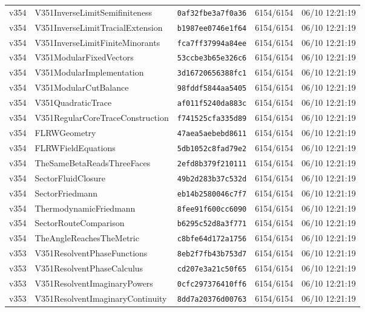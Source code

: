 \documentclass[11pt]{article}
\theoremstyle{definition}\newtheorem{deriv}{Derivation}
\begin{document}
{\begin{longtable}{@{}lllll@{}}
v354 & V351InverseLimitSemifiniteness & \texttt{0af32fbe3a7f0a36} & 6154/6154 & 06/10 12:21:19 \\
v354 & V351InverseLimitTracialExtension & \texttt{b1987ee0746e1f64} & 6154/6154 & 06/10 12:21:19 \\
v354 & V351InverseLimitFiniteMinorants & \texttt{fca7ff37994a84ee} & 6154/6154 & 06/10 12:21:19 \\
v354 & V351ModularFixedVectors & \texttt{53ccbe3b65e326c6} & 6154/6154 & 06/10 12:21:19 \\
v354 & V351ModularImplementation & \texttt{3d16720656388fc1} & 6154/6154 & 06/10 12:21:19 \\
v354 & V351ModularCutBalance & \texttt{98fddf5844aa5405} & 6154/6154 & 06/10 12:21:19 \\
v354 & V351QuadraticTrace & \texttt{af011f5240da883c} & 6154/6154 & 06/10 12:21:19 \\
v354 & V351RegularCoreTraceConstruction & \texttt{f741525cfa335d89} & 6154/6154 & 06/10 12:21:19 \\
v354 & FLRWGeometry & \texttt{47aea5aebebd8611} & 6154/6154 & 06/10 12:21:19 \\
v354 & FLRWFieldEquations & \texttt{5db1052c8fad79e2} & 6154/6154 & 06/10 12:21:19 \\
v354 & TheSameBetaReadsThreeFaces & \texttt{2efd8b379f210111} & 6154/6154 & 06/10 12:21:19 \\
v354 & SectorFluidClosure & \texttt{49b2d283b37c532d} & 6154/6154 & 06/10 12:21:19 \\
v354 & SectorFriedmann & \texttt{eb14b2580046c7f7} & 6154/6154 & 06/10 12:21:19 \\
v354 & ThermodynamicFriedmann & \texttt{8fee91f600cc6090} & 6154/6154 & 06/10 12:21:19 \\
v354 & SectorRouteComparison & \texttt{b6295c52d8a3f771} & 6154/6154 & 06/10 12:21:19 \\
v354 & TheAngleReachesTheMetric & \texttt{c8bfe64d172a1756} & 6154/6154 & 06/10 12:21:19 \\
v353 & V351ResolventPhaseFunctions & \texttt{8eb2f7fb43b753d7} & 6154/6154 & 06/10 12:21:19 \\
v353 & V351ResolventPhaseCalculus & \texttt{cd207e3a21c50f65} & 6154/6154 & 06/10 12:21:19 \\
v353 & V351ResolventImaginaryPowers & \texttt{0cfc297376410ff6} & 6154/6154 & 06/10 12:21:19 \\
v353 & V351ResolventImaginaryContinuity & \texttt{8dd7a20376d00763} & 6154/6154 & 06/10 12:21:19 \\

\end{longtable}}
\end{document}
